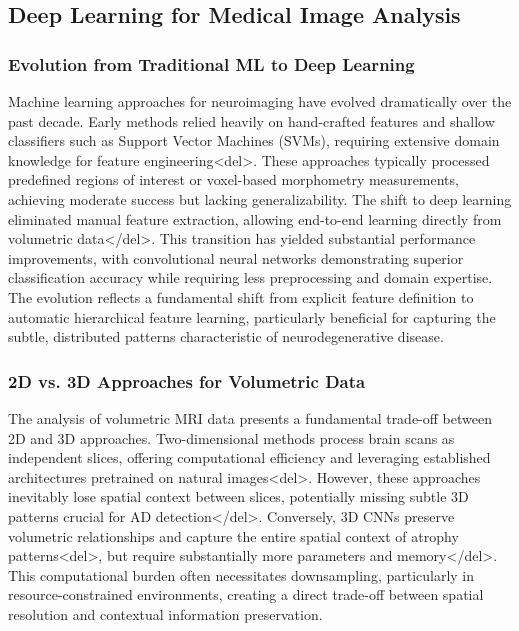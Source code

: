 \documentclass[12pt, a4paper]{article}
\begin{document}
\subsection{Deep Learning for Medical Image Analysis}

\subsubsection{Evolution from Traditional ML to Deep Learning}

Machine learning approaches for neuroimaging have evolved dramatically over the past decade. Early methods relied heavily on hand-crafted features and shallow classifiers such as Support Vector Machines (SVMs), requiring extensive domain knowledge for feature engineering<del>\cite{cuingnet2011automatic}. These approaches typically processed predefined regions of interest or voxel-based morphometry measurements, achieving moderate success but lacking generalizability. The shift to deep learning eliminated manual feature extraction, allowing end-to-end learning directly from volumetric data</del>\cite{litjens2017survey}. This transition has yielded substantial performance improvements, with convolutional neural networks demonstrating superior classification accuracy while requiring less preprocessing and domain expertise. The evolution reflects a fundamental shift from explicit feature definition to automatic hierarchical feature learning, particularly beneficial for capturing the subtle, distributed patterns characteristic of neurodegenerative disease.

\subsubsection{2D vs. 3D Approaches for Volumetric Data}

The analysis of volumetric MRI data presents a fundamental trade-off between 2D and 3D approaches. Two-dimensional methods process brain scans as independent slices, offering computational efficiency and leveraging established architectures pretrained on natural images<del>\cite{liang2021alzheimer, sarraf2016classification}. However, these approaches inevitably lose spatial context between slices, potentially missing subtle 3D patterns crucial for AD detection</del>\cite{gunawardena2017applying}. Conversely, 3D CNNs preserve volumetric relationships and capture the entire spatial context of atrophy patterns<del>\cite{payan2015predicting}, but require substantially more parameters and memory</del>\cite{yang2021reinventing}. This computational burden often necessitates downsampling, particularly in resource-constrained environments, creating a direct trade-off between spatial resolution and contextual information preservation.
\end{document}
